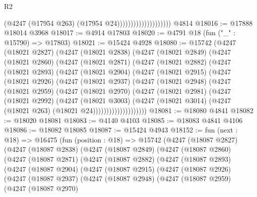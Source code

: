 \begin{lexlean}{R2}
\begin{coremodule}
                                        (@4247 (@17954 @263) (@17954 @24))))))))))))))))))))
    @4814
@18016 := @17888 @18014 @3968
@18017 := @4914 @17803
@18020 := @4791 @18 (fun ("_" : @15790) => @17803)
@18021 := @15424 @4928
@18080 := @15742
    (@4247
      (@18021 @2827)
      (@4247
        (@18021 @2838)
        (@4247
          (@18021 @2849)
          (@4247
            (@18021 @2860)
            (@4247
              (@18021 @2871)
              (@4247
                (@18021 @2882)
                (@4247
                  (@18021 @2893)
                  (@4247
                    (@18021 @2904)
                    (@4247
                      (@18021 @2915)
                      (@4247
                        (@18021 @2926)
                        (@4247
                          (@18021 @2937)
                          (@4247
                            (@18021 @2948)
                            (@4247
                              (@18021 @2959)
                              (@4247
                                (@18021 @2970)
                                (@4247
                                  (@18021 @2981)
                                  (@4247
                                    (@18021 @2992)
                                    (@4247
                                      (@18021 @3003)
                                      (@4247
                                        (@18021 @3014)
                                        (@4247 (@18021 @263) (@18021 @24))))))))))))))))))))
@18081 := @18080 @4841
@18082 := @18020 @18081
@18083 := @4140 @4103
@18085 := @18083 @4841 @4106
@18086 := @18082 @18085
@18087 := @15424 @4943
@18152 := fun (next : @18) =>
  @16475
    (fun (position : @18) =>
    @15742
      (@4247
        (@18087 @2827)
        (@4247
          (@18087 @2838)
          (@4247
            (@18087 @2849)
            (@4247
              (@18087 @2860)
              (@4247
                (@18087 @2871)
                (@4247
                  (@18087 @2882)
                  (@4247
                    (@18087 @2893)
                    (@4247
                      (@18087 @2904)
                      (@4247
                        (@18087 @2915)
                        (@4247
                          (@18087 @2926)
                          (@4247
                            (@18087 @2937)
                            (@4247
                              (@18087 @2948)
                              (@4247
                                (@18087 @2959)
                                (@4247
                                  (@18087 @2970)

\end{coremodule}
\end{lexlean}
